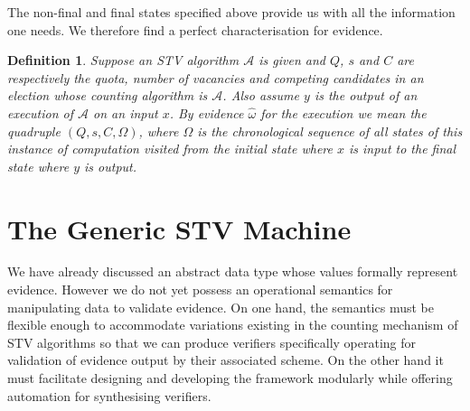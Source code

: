 \documentclass[10pt,conference]{IEEEtran}
\newtheorem{definition}{Definition}
\begin{document}
The non-final and final states specified above provide us with all the information one needs. We therefore find a perfect characterisation for evidence. 
\begin{definition}\label{formalEv}
Suppose an STV algorithm $\mathcal{A}$ is given and $Q$, $s$ and $C$
are respectively the quota, number of vacancies and competing
candidates in an election whose counting algorithm is $\mathcal{A}$. Also assume  $y$ is the output of an execution of $\mathcal{A}$ on an input $x$. By evidence $\hat{\omega}$ for the execution we mean the quadruple $(Q,s,C,\Omega)$, where $\Omega$ is the chronological sequence of all states of this instance of computation visited from the initial state where $x$ is input to the final state where $y$ is output.   
\end{definition}
\section{The Generic STV  Machine}
\label{sec:Machine}
\setlength{\abovedisplayskip}{0.5em}
\setlength{\belowdisplayskip}{0.5em}
We have already discussed an abstract data type whose values
formally represent evidence. However we do not yet possess an
operational semantics for manipulating data to validate evidence.
On one hand, the semantics must be flexible enough to accommodate
variations existing in the counting mechanism of STV algorithms so
that we can produce verifiers  specifically operating for validation
of evidence output by their associated scheme. On the other hand it
must facilitate designing and developing the framework modularly
while offering automation for synthesising verifiers.
\end{document}
